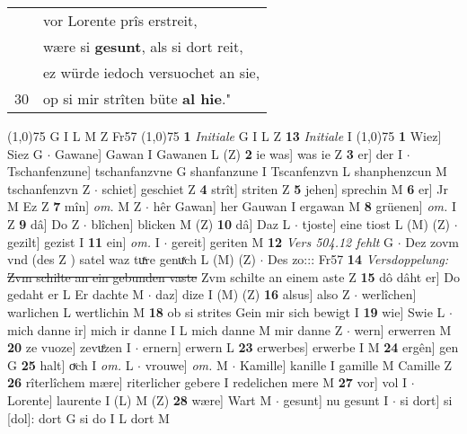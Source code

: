 \documentclass[8pt,a4paper,notitlepage]{article}
\begin{document}
\begin{table}[ht]
\begin{minipage}[t]{0.5\linewidth}
\begin{tabular}{rl}
 & vor Lorente prîs erstreit,\\ 
 & wære si \textbf{gesunt}, als si dort reit,\\ 
 & ez würde iedoch versuochet an sie,\\ 
30 & op si mir strîten büte \textbf{al hie}."\\ 
\end{tabular}
\scriptsize
\line(1,0){75} \newline
G I L M Z Fr57 \newline
\line(1,0){75} \newline
\textbf{1} \textit{Initiale} G I L Z  \textbf{13} \textit{Initiale} I  \newline
\line(1,0){75} \newline
\textbf{1} Wiez] Siez G  $\cdot$ Gawane] Gawan I Gawanen L (Z) \textbf{2} ie was] was ie Z \textbf{3} er] der I  $\cdot$ Tschanfenzune] tschanfanzvne G shanfanzune I Tscanfenzvn L shanphenzcun M tschanfenzvn Z  $\cdot$ schiet] geschiet Z \textbf{4} strît] striten Z \textbf{5} jehen] sprechin M \textbf{6} er] Jr M Ez Z \textbf{7} mîn] \textit{om.} M Z  $\cdot$ hêr Gawan] her Gauwan I ergawan M \textbf{8} grüenen] \textit{om.} I Z \textbf{9} dâ] Do Z  $\cdot$ blîchen] blicken M (Z) \textbf{10} dâ] Daz L  $\cdot$ tjoste] eine tiost L (M) (Z)  $\cdot$ gezilt] gezist I \textbf{11} ein] \textit{om.} I  $\cdot$ gereit] geriten M \textbf{12} \textit{Vers 504.12 fehlt} G   $\cdot$ Dez zovm vnd (des Z ) satel waz tuͯre genuͯch L (M) (Z)  $\cdot$ Des zo::: Fr57 \textbf{14} \textit{Versdoppelung:} \sout{Zvm schilte an ein gebunden vaste} Zvm schilte an einem aste Z  \textbf{15} dô dâht er] Do gedaht er L Er dachte M  $\cdot$ daz] dize I (M) (Z) \textbf{16} alsus] also Z  $\cdot$ werlîchen] warlichen L wertlichin M \textbf{18} ob si strites Gein mir sich bewigt I \textbf{19} wie] Swie L  $\cdot$ mich danne ir] mich ir danne I L mich danne M mir danne Z  $\cdot$ wern] erwerren M \textbf{20} ze vuoze] zevuͤzen I  $\cdot$ ernern] erwern L \textbf{23} erwerbes] erwerbe I M \textbf{24} ergên] gen G \textbf{25} halt] oͮch I \textit{om.} L  $\cdot$ vrouwe] \textit{om.} M  $\cdot$ Kamille] kanille I gamille M Camille Z \textbf{26} rîterlîchem mære] riterlicher gebere I redelichen mere M \textbf{27} vor] vol I  $\cdot$ Lorente] laurente I (L) M (Z) \textbf{28} wære] Wart M  $\cdot$ gesunt] nu gesunt I  $\cdot$ si dort] si [dol]: dort G si do I L dort M \newline
\end{minipage}
\hspace{0.5cm}
\begin{minipage}[t]{0.5\linewidth}

\end{minipage}
\end{table}
\end{document}
